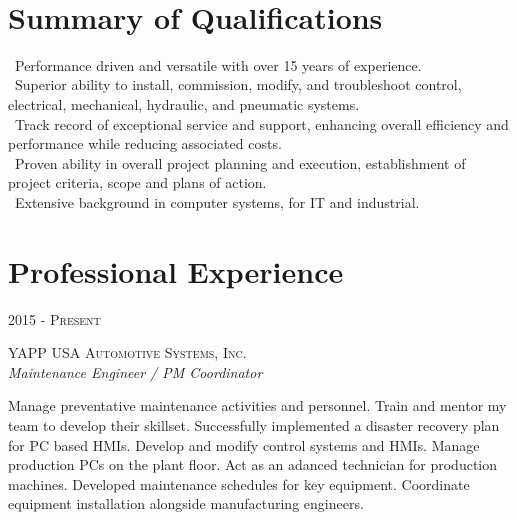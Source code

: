 \documentclass[10pt]{article} %
\begin{document}
\color{text1} %


\par{ \\
\color{headings}\par}
	
\begin{minipage}[t]{0.5\textwidth} %
\vspace{0pt} %

\section{Summary of Qualifications}
\smallskip
\textbullet\ Performance driven and versatile with over 15 years of experience.\\
\textbullet\ Superior ability to install, commission, modify, and troubleshoot control, electrical, mechanical, hydraulic, and pneumatic systems. \\
\textbullet\ Track record of exceptional service and support, enhancing overall efficiency and performance while reducing associated costs. \\ 
\textbullet\ Proven ability in overall project planning and execution, 
establishment of project criteria, scope and plans of action. \\
\textbullet\ Extensive background in computer systems, for IT and industrial.
	\section{Professional Experience}


{\raggedleft\textsc{2015 - Present}\par}

{\raggedright\large\textsc{YAPP USA Automotive Systems, Inc.}\\
\textit{Maintenance Engineer / PM Coordinator}\\[5pt]}
\normalsize{Manage preventative maintenance activities and personnel. Train and mentor my team to develop their skillset. Successfully implemented a disaster recovery plan for PC based HMIs. Develop and modify control systems and HMIs. Manage production PCs on the plant floor. Act as an adanced technician for production machines. Developed maintenance schedules for key equipment. Coordinate equipment installation alongside manufacturing engineers.} 
\smallskip


\end{minipage}
\end{document}
